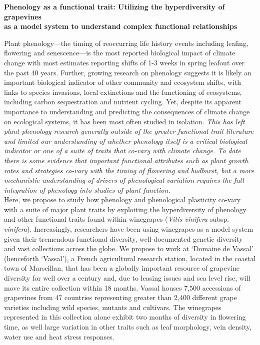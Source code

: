 \documentclass[10pt,letter,oneside]{article}
\begin{document}
\begin{center}
{\bf Phenology as a functional trait: Utilizing the hyperdiversity of grapevines \\ as a model system to understand complex functional relationships}
\end{center}
Plant phenology---the timing of reoccurring life history events including leafing, flowering and senescence---is the most reported biological impact of climate change with most estimates reporting shifts of 1-3 weeks in spring leafout over the past 40 years. Further, growing research on phenology suggests it is likely an important biological indicator of other community and ecosystem shifts, with links to species invasions, local extinctions and the functioning of ecosystems, including carbon sequestration and nutrient cycling. Yet, despite its apparent importance to understanding and predicting the consequences of climate change on ecological systems, it has been most often studied in isolation. \emph{This has left plant phenology research generally outside of the greater functional trait literature and limited our understanding of whether phenology itself is a critical biological indicator or one of a suite of traits that co-vary with climate change. To date there is some evidence that important functional attributes such as plant growth rates and strategies co-vary with the timing of flowering and budburst, but a more mechanistic understanding of drivers of phenological variation requires the full integration of phenology into studies of plant function.} \\

Here, we propose to study how phenology and phenological plasticity co-vary with a suite of major plant traits by exploiting the hyperdiversity of phenology and other functional traits found within winegrapes (\emph{Vitis vinifera} subsp. \emph{vinifera}). Increasingly, researchers have been using winegrapes as a model system given their tremendous functional diversity, well-documented genetic diversity and vast collections across the globe. We propose to work at `Domaine de Vassal' (henceforth `Vassal'), a French agricultural research station, located in the coastal town of Marseillan, that has been a globally important resource of grapevine diversity for well over a century and, due to leasing issues and sea level rise, will move its entire collection within 18 months. Vassal houses 7,500 accessions of grapevines from 47 countries representing greater than 2,400 different grape varieties including wild species, mutants and cultivars. The winegrapes represented in this collection alone exhibit two months of diversity in flowering time, as well large variation in other traits such as leaf morphology, vein density, water use and heat stress responses. \\
\end{document}
